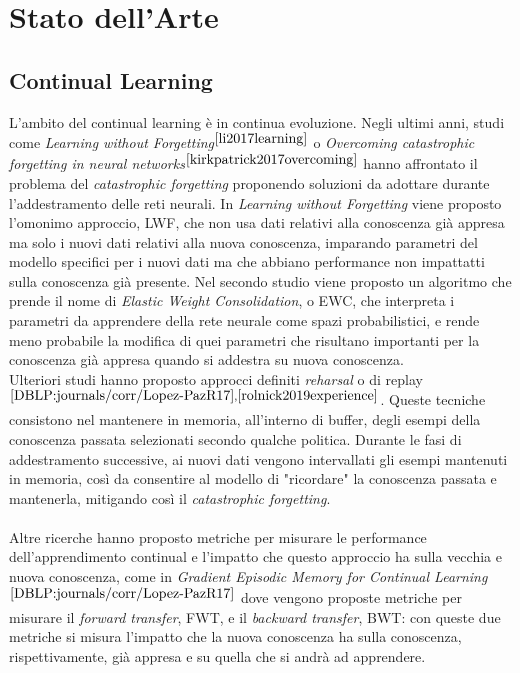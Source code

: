 \section{Stato dell'Arte}
\subsection{Continual Learning} L'ambito del continual learning è in continua evoluzione. Negli ultimi anni, studi come \textit{Learning without Forgetting}$^{\cite{li2017learning}}$ o \textit{Overcoming catastrophic forgetting in neural networks}$^{\cite{kirkpatrick2017overcoming}}$ hanno affrontato il problema del \textit{catastrophic forgetting} proponendo soluzioni da adottare durante l'addestramento delle reti neurali. In \textit{Learning without Forgetting} viene proposto l'omonimo approccio, LWF, che non usa dati relativi alla conoscenza già appresa ma solo i nuovi dati relativi alla nuova conoscenza, imparando parametri del modello specifici per i nuovi dati ma che abbiano performance non impattatti sulla conoscenza già presente. Nel secondo studio viene proposto un algoritmo che prende il nome di \textit{Elastic Weight Consolidation}, o EWC, che interpreta i parametri da apprendere della rete neurale come spazi probabilistici, e rende meno probabile la modifica di quei parametri che risultano importanti per la conoscenza già appresa quando si addestra su nuova conoscenza.\\
Ulteriori studi hanno proposto approcci definiti \textit{reharsal} o di replay$^{\cite{DBLP:journals/corr/Lopez-PazR17},\cite{rolnick2019experience}}$. Queste tecniche consistono nel mantenere in memoria, all'interno di buffer, degli esempi della conoscenza passata selezionati secondo qualche politica. Durante le fasi di addestramento successive, ai nuovi dati vengono intervallati gli esempi mantenuti in memoria, così da consentire al modello di "ricordare" la conoscenza passata e mantenerla, mitigando così il \textit{catastrophic forgetting}.\\\\
Altre ricerche hanno proposto metriche per misurare le performance dell'apprendimento continual e l'impatto che questo approccio ha sulla vecchia e nuova conoscenza, come in \textit{Gradient Episodic Memory for Continual Learning}$^{\cite{DBLP:journals/corr/Lopez-PazR17}}$ dove vengono proposte metriche per misurare il \textit{forward transfer}, FWT, e il \textit{backward transfer}, BWT: con queste due metriche si misura l'impatto che la nuova conoscenza ha sulla conoscenza, rispettivamente, già appresa e su quella che si andrà ad apprendere.\\\\
